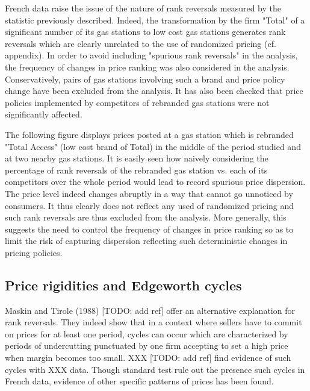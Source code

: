 \documentclass[english]{article}
\begin{document}
French data raise the issue of the nature of rank reversals measured by the statistic previously described. Indeed, the transformation by the firm "Total" of a significant number of its gas stations to low cost gas stations generates rank reversals which are clearly unrelated to the use of randomized pricing (cf. appendix). In order to avoid including "spurious rank reversals" in the analysis, the frequency of changes in price ranking was also considered in the analysis. Conservatively, pairs of gas stations involving such a brand and price policy change have been excluded from the analysis. It has also been checked that price policies implemented by competitors of rebranded gas stations were not significantly affected.

The following figure displays prices posted at a gas station which is rebranded "Total Access" (low cost brand of Total) in the middle of the period studied and at two nearby gas stations. It is easily seen how naively considering the percentage of rank reversals of the rebranded gas station vs. each of its competitors over the whole period would lead to record spurious price dispersion. The price level indeed changes abruptly in a way that cannot go unnoticed by consumers. It thus clearly does not reflect any used of randomized pricing and such rank reversals are thus excluded from the analysis. More generally, this suggests the need to control the frequency of changes in price ranking so as to limit the risk of capturing dispersion reflecting such deterministic changes in pricing policies.

\subsection{Price rigidities and Edgeworth cycles}

Maskin and Tirole (1988) [TODO: add ref] offer an alternative explanation for rank reversals. They indeed show that in a context where sellers have to commit on prices for at least one period, cycles can occur which are characterized by periods of undercutting punctuated by one firm accepting to set a high price when margin becomes too small. XXX [TODO: add ref] find evidence of such cycles with XXX data. Though standard test rule out the presence such cycles in French data, evidence of other specific patterns of prices has been found.
\end{document}
